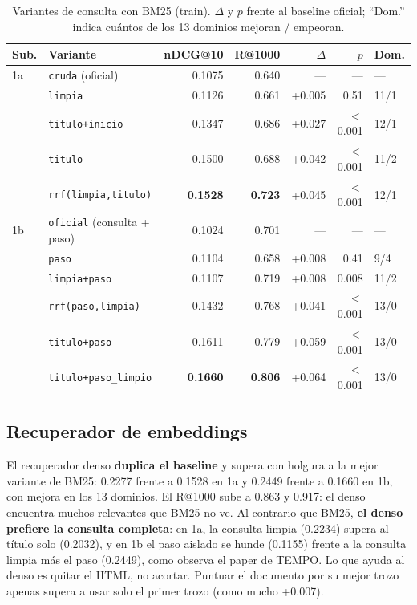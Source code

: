 \documentclass[11pt,a4paper]{article}
\begin{document}
\begin{table}[t]
\centering
\caption{Variantes de consulta con BM25 (train). $\Delta$ y $p$ frente al baseline oficial; ``Dom.'' indica cuántos de los 13 dominios mejoran / empeoran.}
\label{tab:variantes}
\small
\begin{tabular}{llrrrrl}
\toprule
Sub. & Variante & nDCG@10 & R@1000 & $\Delta$ & $p$ & Dom. \\
\midrule
1a & \texttt{cruda} (oficial) & 0.1075 & 0.640 & --- & --- & --- \\
   & \texttt{limpia} & 0.1126 & 0.661 & +0.005 & 0.51 & 11/1 \\
   & \texttt{titulo+inicio} & 0.1347 & 0.686 & +0.027 & $<$0.001 & 12/1 \\
   & \texttt{titulo} & 0.1500 & 0.688 & +0.042 & $<$0.001 & 11/2 \\
   & \texttt{rrf(limpia,titulo)} & \textbf{0.1528} & \textbf{0.723} & +0.045 & $<$0.001 & 12/1 \\
\midrule
1b & \texttt{oficial} (consulta + paso) & 0.1024 & 0.701 & --- & --- & --- \\
   & \texttt{paso} & 0.1104 & 0.658 & +0.008 & 0.41 & 9/4 \\
   & \texttt{limpia+paso} & 0.1107 & 0.719 & +0.008 & 0.008 & 11/2 \\
   & \texttt{rrf(paso,limpia)} & 0.1432 & 0.768 & +0.041 & $<$0.001 & 13/0 \\
   & \texttt{titulo+paso} & 0.1611 & 0.779 & +0.059 & $<$0.001 & 13/0 \\
   & \texttt{titulo+paso\_limpio} & \textbf{0.1660} & \textbf{0.806} & +0.064 & $<$0.001 & 13/0 \\
\bottomrule
\end{tabular}
\end{table}

\subsection{Recuperador de embeddings}
\label{sec:res-denso}

El recuperador denso \textbf{duplica el baseline} y supera con holgura a la mejor variante de BM25: 0.2277 frente a 0.1528 en 1a y 0.2449 frente a 0.1660 en 1b, con mejora en los 13 dominios. El R@1000 sube a 0.863 y 0.917: el denso encuentra muchos relevantes que BM25 no ve. Al contrario que BM25, \textbf{el denso prefiere la consulta completa}: en 1a, la consulta limpia (0.2234) supera al título solo (0.2032), y en 1b el paso aislado se hunde (0.1155) frente a la consulta limpia más el paso (0.2449), como observa el paper de TEMPO. Lo que ayuda al denso es quitar el HTML, no acortar. Puntuar el documento por su mejor trozo apenas supera a usar solo el primer trozo (como mucho +0.007).
\end{document}
